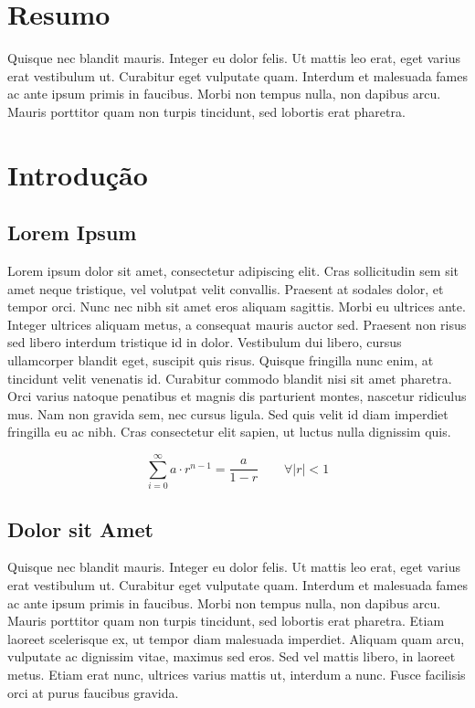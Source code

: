 \section*{Resumo}
Quisque nec blandit mauris. Integer eu dolor felis. 
Ut mattis leo erat, eget varius erat vestibulum ut. 
Curabitur eget vulputate quam. Interdum et malesuada fames ac ante ipsum primis in faucibus. 
Morbi non tempus nulla, non dapibus arcu. 
Mauris porttitor quam non turpis tincidunt, sed lobortis erat pharetra.

\section{Introdução}
\subsection{Lorem Ipsum}
Lorem ipsum dolor sit amet, consectetur adipiscing elit. 
Cras sollicitudin sem sit amet neque tristique, vel volutpat velit convallis. 
Praesent at sodales dolor, et tempor orci. Nunc nec nibh sit amet eros aliquam sagittis. 
Morbi eu ultrices ante. Integer ultrices aliquam metus, a consequat mauris auctor sed. 
Praesent non risus sed libero interdum tristique id in dolor. 
Vestibulum dui libero, cursus ullamcorper blandit eget, suscipit quis risus. 
Quisque fringilla nunc enim, at tincidunt velit venenatis id. 
Curabitur commodo blandit nisi sit amet pharetra. 
Orci varius natoque penatibus et magnis dis parturient montes, nascetur ridiculus mus. 
Nam non gravida sem, nec cursus ligula. Sed quis velit id diam imperdiet fringilla eu ac nibh. 
Cras consectetur elit sapien, ut luctus nulla dignissim quis.
 
$$
    \sum_{i=0}^{\infty} a \cdot r^{n-1} = \frac{a}{1-r}
    \qquad \forall |r| < 1
$$

\subsection{Dolor sit Amet}
Quisque nec blandit mauris. Integer eu dolor felis. 
Ut mattis leo erat, eget varius erat vestibulum ut. 
Curabitur eget vulputate quam. Interdum et malesuada fames ac ante ipsum primis in faucibus. 
Morbi non tempus nulla, non dapibus arcu. 
Mauris porttitor quam non turpis tincidunt, sed lobortis erat pharetra. 
Etiam laoreet scelerisque ex, ut tempor diam malesuada imperdiet. 
Aliquam quam arcu, vulputate ac dignissim vitae, maximus sed eros. 
Sed vel mattis libero, in laoreet metus. 
Etiam erat nunc, ultrices varius mattis ut, interdum a nunc. 
Fusce facilisis orci at purus faucibus gravida. 
